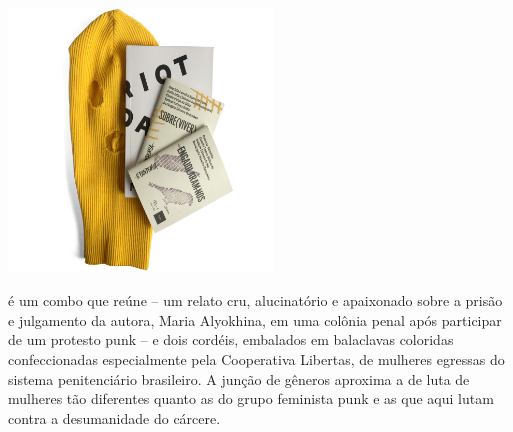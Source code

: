 \begin{center}
\hspace*{-.5cm}\includegraphics[width=70mm]{./grid/riot.jpg}
\end{center}

\hspace*{-7cm}\hrulefill\hspace*{-7cm}

\medskip

 é um combo que reúne {} -- um relato cru, alucinatório e apaixonado sobre a prisão e julgamento da autora, Maria Alyokhina, em uma colônia penal após participar de um protesto punk -- e dois cordéis, embalados em balaclavas coloridas confeccionadas especialmente pela Cooperativa Libertas, de mulheres egressas do sistema penitenciário brasileiro. A junção de gêneros aproxima a de luta de mulheres tão diferentes quanto as do grupo feminista punk {} e as que aqui lutam contra a desumanidade do cárcere.

\vfill

\hspace*{-.4cm}\begin{minipage}[c]{1\linewidth}
\small{
{}}
\end{minipage}

